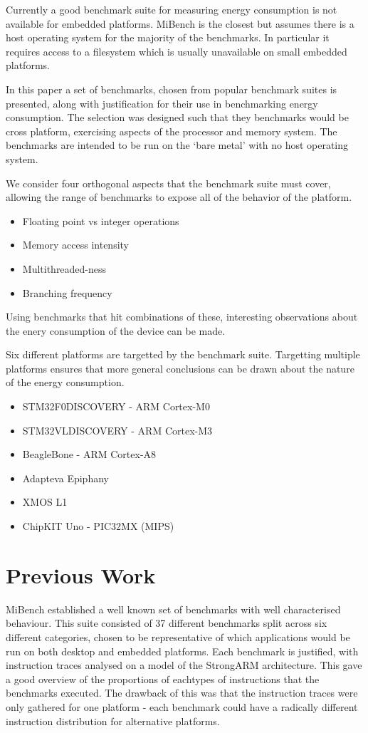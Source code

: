 \documentclass[twocolumn]{article}
\newcommand{\nsection}[1]{\section{\bfseries #1}}
\begin{document}
Currently a good benchmark suite for measuring energy consumption is not available for embedded platforms. MiBench is the closest but assumes there is a host operating system for the majority of the benchmarks. In particular it requires access to a filesystem which is usually unavailable on small embedded platforms.

In this paper a set of benchmarks, chosen from popular benchmark suites is presented, along with justification for their use in benchmarking energy consumption. The selection was designed such that they benchmarks would be cross platform, exercising aspects of the processor and memory system. The benchmarks are intended to be run on the ‘bare metal’ with no host operating system.

We consider four orthogonal aspects that the benchmark suite must cover, allowing the range of benchmarks to expose all of the behavior of the platform.

\begin{itemize}
	\setlength{\itemsep}{-0.25em}
	\item Floating point vs integer operations
	\item Memory access intensity
	\item Multithreaded-ness
	\item Branching frequency
\end{itemize}

Using benchmarks that hit combinations of these, interesting observations about the enery consumption of the device can be made.

Six different platforms are targetted by the benchmark suite. Targetting multiple platforms ensures that more general conclusions can be drawn about the nature of the energy consumption.
\begin{itemize}
	\setlength{\itemsep}{-0.25em}
	\item STM32F0DISCOVERY - ARM Cortex-M0
	\item STM32VLDISCOVERY - ARM Cortex-M3
	\item BeagleBone - ARM Cortex-A8
	\item Adapteva Epiphany
	\item XMOS L1
	\item ChipKIT Uno - PIC32MX (MIPS)
\end{itemize}

\nsection{Previous Work}

MiBench established a well known set of benchmarks with well characterised behaviour. This suite consisted of 37 different benchmarks split across six different categories, chosen to be representative of which applications would be run on both desktop and embedded platforms. Each benchmark is justified, with instruction traces analysed on a model of the StrongARM architecture. This gave a good overview of the proportions of eachtypes of instructions that the benchmarks executed. The drawback of this was that the instruction traces were only gathered for one platform - each benchmark could have a radically different instruction distribution for alternative platforms.
\end{document}
